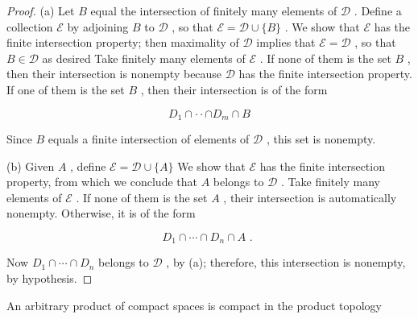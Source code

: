 \begin{proof}(a) Let \(B\) equal the intersection of finitely many elements of \(\mathcal{D}\) . Define a collection \(\mathcal{E}\) by adjoining \(B\) to \(\mathcal{D}\) , so that \(\mathcal{E} = \mathcal{D} \cup  \{ B\}\) . We show that \(\mathcal{E}\) has the finite intersection property; then maximality of \(\mathcal{D}\) implies that \(\mathcal{E} = \mathcal{D}\) , so that \(B \in  \mathcal{D}\) as desired
Take finitely many elements of \(\mathcal{E}\) . If none of them is the set \(B\) , then their intersection is nonempty because \(\mathcal{D}\) has the finite intersection property. If one of them is the set \(B\) , then their intersection is of the form

\[
{D}_{1} \cap   \cdot   \cdot   \cap  {D}_{m} \cap  B
\]

Since \(B\) equals a finite intersection of elements of \(\mathcal{D}\) , this set is nonempty.

(b) Given \(A\) , define \(\mathcal{E} = \mathcal{D} \cup  \{ A\}\) We show that \(\mathcal{E}\) has the finite intersection property, from which we conclude that \(A\) belongs to \(\mathcal{D}\) . Take finitely many elements of \(\mathcal{E}\) . If none of them is the set \(A\) , their intersection is automatically nonempty. Otherwise, it is of the form

\[
{D}_{1} \cap  \cdots  \cap  {D}_{n} \cap  A\text{ . }
\]

Now \({D}_{1} \cap  \cdots  \cap  {D}_{n}\) belongs to \(\mathcal{D}\) , by (a); therefore, this intersection is nonempty, by hypothesis.
\end{proof}
\begin{theorem} An arbitrary product of compact spaces is compact in the product topology
\end{theorem}

